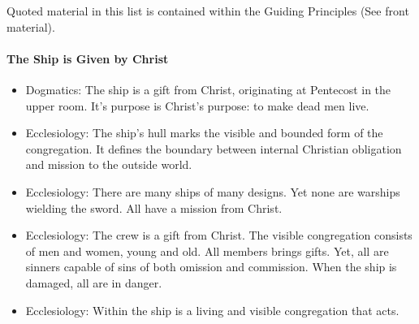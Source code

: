 Quoted material in this list is contained within the Guiding Principles (See front material).


\paragraph{The Ship is Given by Christ}
\begin{itemize}

\item Dogmatics: The ship is a gift from Christ, originating at Pentecost in the upper room. It's purpose is Christ's purpose: to make dead men live.

\item Ecclesiology: The ship's hull marks the visible and bounded form of the congregation. It defines the boundary between internal Christian obligation and mission to the outside world.

\item Ecclesiology: There are many ships of many designs. Yet none are warships wielding the sword. All have a mission from Christ.

\item Ecclesiology: The crew is a gift from Christ. The visible congregation consists of men and women, young and old. All members brings gifts. Yet, all are sinners capable of sins of both omission and commission. When the ship is damaged, all are in danger.

\item Ecclesiology: Within the ship is a living and visible congregation that acts.

\end{itemize}


